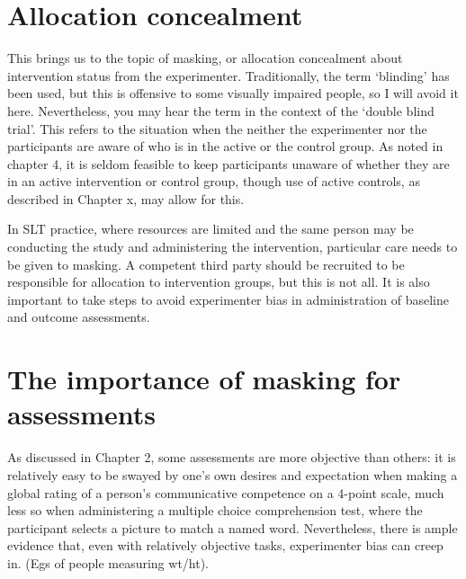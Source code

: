 \documentclass[]{book}
\begin{document}
\hypertarget{allocation-concealment}{%
\section{Allocation concealment}\label{allocation-concealment}}

This brings us to the topic of masking, or allocation concealment about intervention status from the experimenter. Traditionally, the term `blinding' has been used, but this is offensive to some visually impaired people, so I will avoid it here. Nevertheless, you may hear the term in the context of the `double blind trial'. This refers to the situation when the neither the experimenter nor the participants are aware of who is in the active or the control group. As noted in chapter 4, it is seldom feasible to keep participants unaware of whether they are in an active intervention or control group, though use of active controls, as described in Chapter x, may allow for this.

In SLT practice, where resources are limited and the same person may be conducting the study and administering the intervention, particular care needs to be given to masking. A competent third party should be recruited to be responsible for allocation to intervention groups, but this is not all. It is also important to take steps to avoid experimenter bias in administration of baseline and outcome assessments.

\hypertarget{the-importance-of-masking-for-assessments}{%
\section{The importance of masking for assessments}\label{the-importance-of-masking-for-assessments}}

As discussed in Chapter 2, some assessments are more objective than others: it is relatively easy to be swayed by one's own desires and expectation when making a global rating of a person's communicative competence on a 4-point scale, much less so when administering a multiple choice comprehension test, where the participant selects a picture to match a named word. Nevertheless, there is ample evidence that, even with relatively objective tasks, experimenter bias can creep in. (Egs of people measuring wt/ht).
\end{document}
